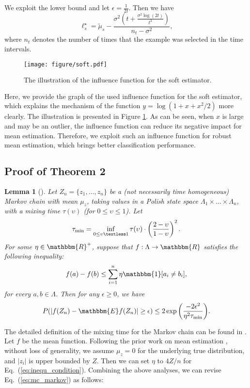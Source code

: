 \documentclass[11pt]{article}
\newtheorem{lemma}{Lemma}
\begin{document}
We exploit the lower bound and let $\epsilon=\frac{1}{2t}$. Then we have
\begin{equation}
    \ell_s^{\star}=\tilde{\mu}_s-\frac{\sigma^2(t+\frac{\sigma^2\log(2t)}{t^2})}{n_t-\sigma^2},
\end{equation}
where $n_t$ denotes the number of times that the example was selected in the time intervals.

\begin{figure}[!h] 
\centering
\texttt{[image: figure/soft.pdf]}
\caption{The illustration of the influence function for the soft estimator.}
\label{fig:soft} 
\end{figure}
Here, we provide the graph of the used influence function for the soft estimator, which explains the mechanism of the function $y=\log(1+x+x^2/2)$ more clearly. The illustration is presented in Figure \ref{fig:soft}. As can be seen, when $x$ is large and may be an outlier, the influence function can reduce its negative impact for mean estimation. Therefore, we exploit such an influence function for robust mean estimation, which brings better classification performance.


\subsection{Proof of Theorem 2}



\begin{lemma}[\cite{paulin2015concentration}]
Let $Z_n=\{z_1,\ldots,z_n\}$ be a (not necessarily time homogeneous) Markov chain with mean $\mu_z$, taking values
in a Polish state space $\Lambda_1\times\ldots\times\Lambda_n$, with a mixing time $\tau(\upsilon)$ (for $0\leq\upsilon\leq 1$). Let
\begin{equation}
    \tau_{\min}=\inf_{0\leq\upsilon\textless 1}\tau(\upsilon)\cdot\left(\frac{2-\upsilon}{1-\upsilon}\right)^2.
\end{equation}
For some $\eta\in\mathbbm{R}^{+}$, suppose that $f:\Lambda\rightarrow\mathbbm{R}$ satisfies the following inequality: 
\begin{equation}\label{eq:inequ_condition}
    f(a)-f(b)\leq\sum_{i=1}^n \eta\mathbbm{1}[a_i\neq b_i],
\end{equation}
for every $a,b\in\Lambda$. Then for any $\epsilon\geq 0$, we have 
\begin{equation}\label{eq:mc_markov}
    P(|f(Z_n)-\mathbbm{E}f(Z_n)|\geq \epsilon)\leq 2\exp{\left(\frac{-2\epsilon^2}{\eta^2\tau_{\min}}\right)}.
\end{equation}
\end{lemma}
The detailed definition of the mixing time for the Markov chain can be found in \cite{paulin2015concentration,roberts2004general}. 
Let $f$ be the mean function. Following the prior work on mean estimation \cite{liu2019high,diakonikolas2020outlier,diakonikolas2019recent,niss2020you}, without loss of generality, we assume $\mu_z=0$ for the underlying true distribution, and $|z_i|$ is upper bounded by $Z$. Then we can set $\eta$ to $4Z/n$ for Eq.~(\ref{eq:inequ_condition}). Combining the above analyses, we can revise Eq.~(\ref{eq:mc_markov}) as follows:
\end{document}
